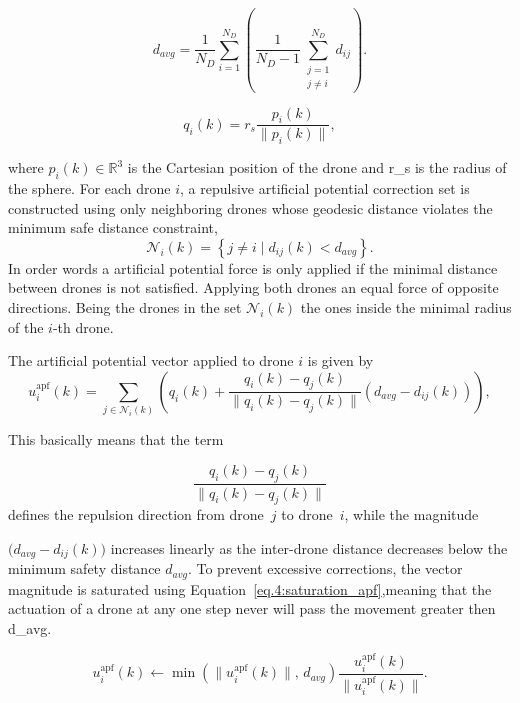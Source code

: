 \begin{equation}
  d_{avg} = \frac{1}{N_D} \sum_{i=1}^{N_D} 
  \left( \frac{1}{N_D-1} \sum_{\substack{j=1 \\ j \neq i}}^{N_D} d_{ij} \right).
  \label{eq.4:d_avg between drones}
\end{equation}

\begin{equation}
  q_i(k) = r_s \frac{p_i(k)}{\|p_i(k)\|},
  \label{eq.4:project_to_sphere}
\end{equation}

where $p_i(k) \in \mathbb{R}^3$ is the Cartesian position of the drone and \gls{r_s} is the radius of the sphere. For each drone $i$, a repulsive artificial potential correction set is constructed using only neighboring drones whose geodesic distance violates the minimum safe distance constraint,
\begin{equation}
  \mathcal{N}_i(k) = \left\{ j \neq i \mid d_{ij}(k) < d_{avg} \right\}.
\end{equation}
In order words a artificial potential force is only applied if the minimal distance between drones is not satisfied. Applying both drones an equal force of opposite directions. Being the drones in the set $\mathcal{N}_i(k)$ the ones inside the minimal radius of the $i$-th drone.

The artificial potential vector applied to drone $i$ is given by
\begin{equation}
  u_i^{\mathrm{apf}}(k) =
  \sum_{j \in \mathcal{N}_i(k)}
  \left(
  q_i(k) +
  \frac{q_i(k) - q_j(k)}{\|q_i(k) - q_j(k)\|}
  \left( d_{avg} - d_{ij}(k) \right)
  \right),
\end{equation}

This basically means that the term

\begin{equation*}
  \frac{q_i(k)-q_j(k)}{\|q_i(k)-q_j(k)\|}
\end{equation*}
defines the repulsion direction from drone~$j$ to drone~$i$, while the magnitude

$\bigl(d_{avg}-d_{ij}(k)\bigr)$ increases linearly as the inter-drone distance
decreases below the minimum safety distance $d_{avg}$. To prevent excessive corrections, the vector magnitude is saturated using Equation~\eqref{eq.4:saturation_apf},meaning that the actuation of a drone at any one step never will pass the movement greater then \gls{d_avg}.

\begin{equation}
  u_i^{\mathrm{apf}}(k) \leftarrow
  \min\!\left( \|u_i^{\mathrm{apf}}(k)\|,\, d_{avg} \right)
  \frac{u_i^{\mathrm{apf}}(k)}{\|u_i^{\mathrm{apf}}(k)\|}.
  \label{eq.4:saturation_apf}
\end{equation}

